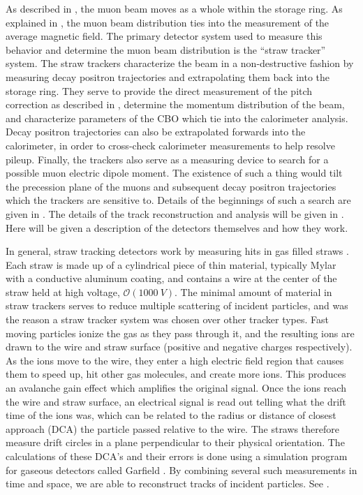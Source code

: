 As described in , the muon beam moves as a whole within the storage ring. As explained in , the muon beam distribution ties into the measurement of the average magnetic field. The primary detector system used to measure this behavior and determine the muon beam distribution is the ``straw tracker'' system. The straw trackers characterize the beam in a non-destructive fashion by measuring decay positron trajectories and extrapolating them back into the storage ring. They serve to provide the direct measurement of the pitch correction as described in , determine the momentum distribution of the beam, and characterize parameters of the CBO which tie into the calorimeter \wa analysis. Decay positron trajectories can also be extrapolated forwards into the calorimeter, in order to cross-check calorimeter measurements to help resolve pileup. Finally, the trackers also serve as a measuring device to search for a possible muon electric dipole moment. The existence of such a thing would tilt the precession plane of the muons and subsequent decay positron trajectories which the trackers are sensitive to. Details of the beginnings of such a search are given in . The details of the track reconstruction and analysis will be given in . Here will be given a description of the detectors themselves and how they work.


In general, straw tracking detectors work by measuring hits in gas filled straws \cite{Blum}. Each straw is made up of a cylindrical piece of thin material, typically Mylar with a conductive aluminum coating, and contains a wire at the center of the straw held at high voltage, $\mathcal{O}(\SI{1000}{V})$. The minimal amount of material in straw trackers serves to reduce multiple scattering of incident particles, and was the reason a straw tracker system was chosen over other tracker types. Fast moving particles ionize the gas as they pass through it, and the resulting ions are drawn to the wire and straw surface (positive and negative charges respectively). As the ions move to the wire, they enter a high electric field region that causes them to speed up, hit other gas molecules, and create more ions. This produces an avalanche gain effect which amplifies the original signal. Once the ions reach the wire and straw surface, an electrical signal is read out telling what the drift time of the ions was, which can be related to the radius or distance of closest approach (DCA) the particle passed relative to the wire. The straws therefore measure drift circles in a plane perpendicular to their physical orientation. The calculations of these DCA's and their errors is done using a simulation program for gaseous detectors called Garfield \cite{garfield1,garfield2}. By combining several such measurements in time and space, we are able to reconstruct tracks of incident particles. See .

